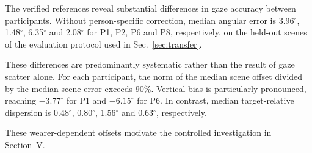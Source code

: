 The verified references reveal substantial differences
in gaze accuracy between participants. Without
person-specific correction, median angular error is
3.96$^\circ$, 1.48$^\circ$, 6.35$^\circ$ and 2.08$^\circ$ for
P1, P2, P6 and P8, respectively, on the held-out scenes
of the evaluation protocol used in Sec.~\ref{sec:transfer}.

These differences are predominantly systematic rather
than the result of gaze scatter alone. For each participant, the norm of the median scene offset
divided by the median scene error exceeds 90\%. Vertical
bias is particularly pronounced, reaching
$-3.77^\circ$ for P1 and $-6.15^\circ$ for P6.
In contrast, median target-relative dispersion is
0.48$^\circ$, 0.80$^\circ$, 1.56$^\circ$ and 0.63$^\circ$,
respectively.

These wearer-dependent offsets motivate
the controlled investigation in Section~V.
